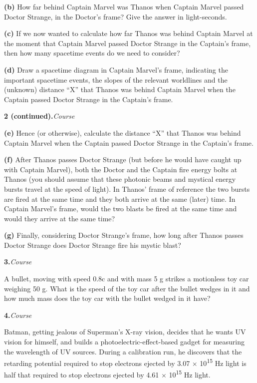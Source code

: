 \documentclass[12pt,letterpaper]{article}
\newcommand{\question}[2]{\noindent\textbf{#1.}\hfill\textit{#2}\par\medskip}
\begin{document}
\textbf{(b)} How far behind Captain Marvel was Thanos when Captain Marvel passed Doctor Strange, in the Doctor's frame? Give the answer in light-seconds.


\vfill

\textbf{(c)} If we now wanted to calculate how far Thanos was behind Captain Marvel at the moment that Captain Marvel passed Doctor Strange in the Captain's frame, then how many spacetime events do we need to consider?


\vfill

\textbf{(d)} Draw a spacetime diagram in Captain Marvel's frame, indicating the important spacetime events, the slopes of the relevant worldlines and the (unknown) distance ``X'' that Thanos was behind Captain Marvel when the Captain passed Doctor Strange in the Captain's frame.


\newpage

\question{2 (continued)}{Course}

\textbf{(e)} Hence (or otherwise), calculate the distance ``X'' that Thanos was behind Captain Marvel when the Captain passed Doctor Strange in the Captain's frame.


\vfill

\textbf{(f)} After Thanos passes Doctor Strange (but before he would have caught up with Captain Marvel), both the Doctor and the Captain fire energy bolts at Thanos (you should assume that these photonic beams and mystical energy bursts travel at the speed of light). In Thanos' frame of reference the two bursts are fired at the same time and they both arrive at the same (later) time. In Captain Marvel's frame, would the two blasts be fired at the same time and would they arrive at the same time?


\vfill

\textbf{(g)} Finally, considering Doctor Strange's frame, how long after Thanos passes Doctor Strange does Doctor Strange fire his mystic blast?


\newpage

\question{3}{Course}

A bullet, moving with speed 0.8c and with mass 5 g strikes a motionless toy car weighing 50 g. What is the speed of the toy car after the bullet wedges in it and how much mass does the toy car with the bullet wedged in it have?


\newpage

\question{4}{Course}

Batman, getting jealous of Superman's X-ray vision, decides that he wants UV vision for himself, and builds a photoelectric-effect-based gadget for measuring the wavelength of UV sources. During a calibration run, he discovers that the retarding potential required to stop electrons ejected by 3.07 \ensuremath{\times} 10\textsuperscript{15} Hz light is half that required to stop electrons ejected by 4.61 \ensuremath{\times} 10\textsuperscript{15} Hz light.
\end{document}
